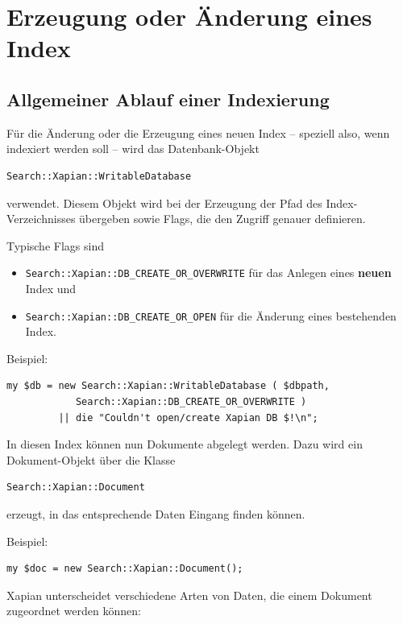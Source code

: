 \documentclass[11pt, twoside, a4paper, BCOR8mm, DIV12, bibtotoc,idxtotoc]{scrbook}
\begin{document}
\section{Erzeugung oder Änderung eines Index}


\subsection{Allgemeiner Ablauf einer Indexierung}

Für die Änderung oder die Erzeugung eines neuen Index -- speziell
also, wenn indexiert werden soll -- wird das Datenbank-Objekt
\begin{verbatim}
Search::Xapian::WritableDatabase
\end{verbatim}
verwendet. Diesem Objekt wird bei der Erzeugung der Pfad des
Index-Verzeichnisses übergeben sowie Flags, die den Zugriff genauer
definieren.

Typische Flags sind
\begin{itemize}
\item \texttt{Search::Xapian::DB\_CREATE\_OR\_OVERWRITE} für das
  Anlegen eines \textbf{neuen} Index und
\item \texttt{Search::Xapian::DB\_CREATE\_OR\_OPEN} für die Änderung
  eines bestehenden Index.
\end{itemize}

Beispiel:
\begin{verbatim}
my $db = new Search::Xapian::WritableDatabase ( $dbpath,
            Search::Xapian::DB_CREATE_OR_OVERWRITE ) 
         || die "Couldn't open/create Xapian DB $!\n";
\end{verbatim}
In diesen Index können nun Dokumente abgelegt werden. Dazu wird ein
Dokument-Objekt über die Klasse
\begin{verbatim}
Search::Xapian::Document
\end{verbatim}
erzeugt, in das entsprechende Daten Eingang finden können.

Beispiel:
\begin{verbatim}
my $doc = new Search::Xapian::Document();
\end{verbatim}

Xapian unterscheidet verschiedene Arten von Daten, die einem Dokument
zugeordnet werden können:
\end{document}
